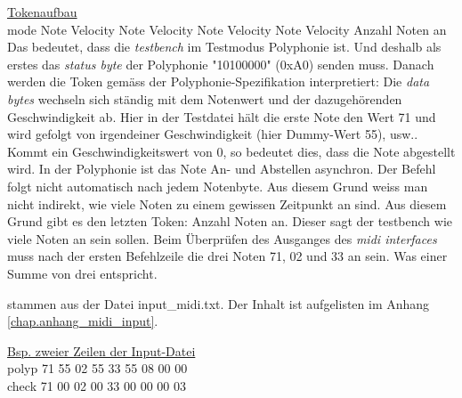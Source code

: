 \underline{Tokenaufbau}\\
mode	\hspace{2mm} Note \hspace*{2mm} 	Velocity	\hspace*{2mm} Note \hspace*{2mm}  Velocity \hspace*{2mm} 	Note \hspace*{2mm} 	Velocity \hspace*{2mm} 	Note \hspace*{2mm} 	Velocity \hspace*{2mm}  Anzahl Noten an\\

Das bedeutet, dass die \textit{testbench} im Testmodus Polyphonie ist. Und deshalb als erstes das \textit{status byte} der Polyphonie "10100000" (0xA0) senden muss. Danach werden die Token gemäss der Polyphonie-Spezifikation interpretiert: Die \textit{data bytes} wechseln sich ständig mit dem Notenwert und der dazugehörenden Geschwindigkeit ab. Hier in der Testdatei hält die erste Note den Wert 71 und wird gefolgt von irgendeiner Geschwindigkeit (hier Dummy-Wert 55), usw.. Kommt ein Geschwindigkeitswert von 0, so bedeutet dies, dass die Note abgestellt wird.
In der Polyphonie ist das Note An- und Abstellen asynchron. Der Befehl folgt nicht automatisch nach jedem Notenbyte. Aus diesem Grund weiss man nicht indirekt, wie viele Noten zu einem gewissen Zeitpunkt an sind. Aus diesem Grund gibt es den letzten Token: Anzahl Noten an. Dieser sagt der testbench wie viele Noten an sein sollen.
Beim Überprüfen des Ausganges des \textit{midi interfaces} muss nach der ersten Befehlzeile die drei Noten 71, 02 und 33 an sein. Was einer Summe von drei entspricht.



 stammen aus der Datei input\_midi.txt. Der Inhalt ist aufgelisten im Anhang \ref{chap.anhang_midi_input}.


\underline{Bsp. zweier Zeilen der Input-Datei}\\
polyp \hspace*{2mm} 71 \hspace*{4mm} 55 \hspace*{12mm}  02 \hspace*{6mm} 55 \hspace*{10mm} 33 \hspace*{6mm} 55 \hspace*{10mm} 08 \hspace*{6mm} 00 \hspace*{12mm} 00\\
check \hspace*{2mm} 71 \hspace*{4mm} 00 \hspace*{12mm}  02 \hspace*{6mm} 00 \hspace*{10mm} 33 \hspace*{6mm} 00 \hspace*{10mm} 00 \hspace*{6mm} 00 \hspace*{12mm} 03\\


